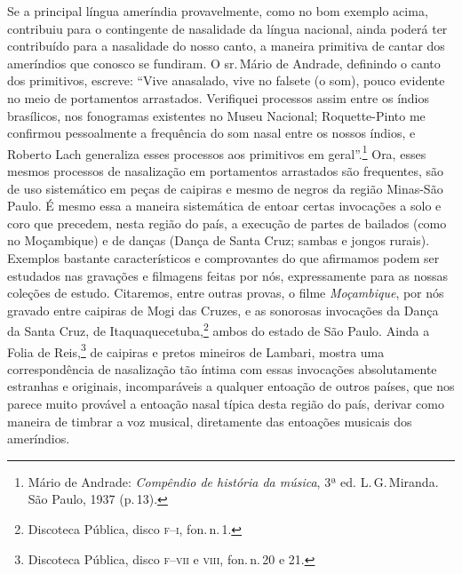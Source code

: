 Se a principal língua ameríndia provavelmente, como no bom exemplo
acima, contribuiu para o contingente de nasalidade da língua nacional,
ainda poderá ter contribuído para a nasalidade do nosso canto, a maneira
primitiva de cantar dos ameríndios que conosco se fundiram. O sr.\,Mário
de Andrade, definindo o canto dos primitivos, escreve: ``Vive anasalado,
vive no falsete (o som), pouco evidente no meio de portamentos
arrastados. Verifiquei processos assim entre os índios brasílicos, nos
fonogramas existentes no Museu Nacional; Roquette-Pinto me confirmou
pessoalmente a frequência do som nasal entre os nossos índios, e Roberto
Lach generaliza esses processos aos primitivos em geral''.\footnote{Mário de Andrade: \textit{Compêndio de história da música}, 3ª ed. L.\,G.\,Miranda. São Paulo, 1937 (p.\,13).} Ora,
esses mesmos processos de nasalização em portamentos arrastados são
frequentes, são de uso sistemático em peças de caipiras e mesmo de
negros da região Minas-São Paulo. É mesmo essa a maneira sistemática de
entoar certas invocações a solo e coro que precedem, nesta região do
país, a execução de partes de bailados (como no Moçambique) e de danças
(Dança de Santa Cruz; sambas e jongos rurais). Exemplos bastante
característicos e comprovantes do que afirmamos podem ser estudados nas
gravações e filmagens feitas por nós, expressamente para as nossas
coleções de estudo. Citaremos, entre outras provas, o filme \textit{Moçambique},
por nós gravado entre caipiras de Mogi das Cruzes, e as sonorosas
invocações da Dança da Santa Cruz, de Itaquaquecetuba,\footnote{Discoteca
Pública, disco \textsc{f}--\textsc{i}, fon.\,n.\,1.} ambos do estado de São Paulo. Ainda a
Folia de Reis,\footnote{Discoteca Pública, disco \textsc{f}--\textsc{vii} e \textsc{viii}, fon.\,n.\,20 e 21.} de
caipiras e pretos mineiros de Lambari, mostra uma correspondência de
nasalização tão íntima com essas invocações absolutamente estranhas e
originais, incomparáveis a qualquer entoação de outros países, que nos
parece muito provável a entoação nasal típica desta região do país,
derivar como maneira de timbrar a voz musical, diretamente das entoações
musicais dos ameríndios.

